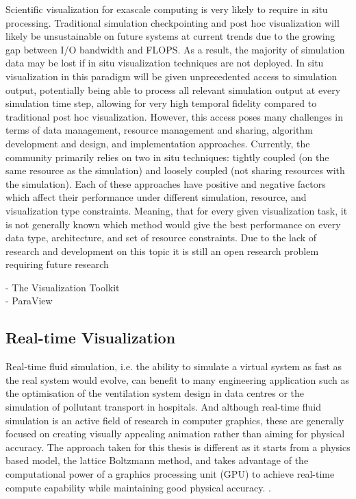 Scientific visualization for exascale computing is very likely to require in situ processing. Traditional simulation checkpointing and post hoc visualization will likely be unsustainable on future systems at current trends due to the growing gap between I/O bandwidth and FLOPS. As a result, the majority of simulation data may be lost if in situ visualization techniques are not deployed. In situ visualization in this paradigm will be given unprecedented access to simulation output, potentially being able to process all relevant simulation output at every simulation time step, allowing for very high temporal fidelity compared to traditional post hoc visualization. However, this access poses many challenges in terms of data management, resource management and sharing, algorithm development and design, and implementation approaches. Currently, the community primarily relies on two in situ techniques: tightly coupled (on the same resource as the simulation) and loosely coupled (not sharing resources with the simulation). Each of these approaches have positive and negative factors which affect their performance under different simulation, resource, and visualization type constraints. Meaning, that for every given visualization task, it is not generally known which method would give the best performance on every data type, architecture, and set of resource constraints. Due to the lack of research and development on this topic it is still an open research problem requiring future research
\citep{kressSituVisualizationTechniques}

- The Visualization Toolkit \\
- ParaView \\


\subsection{Real-time Visualization}
\label{rt-viz}

Real-time fluid simulation, i.e. the ability to simulate a virtual system as fast as the real system would evolve, can benefit to many engineering application such as the optimisation of the ventilation system design in data centres or the simulation of pollutant transport in hospitals. And although real-time fluid simulation is an active field of research in computer graphics, these are generally focused on creating visually appealing animation rather than aiming for physical accuracy. The approach taken for this thesis is different as it starts from a physics based model, the lattice Boltzmann method, and takes advantage of the computational power of a graphics processing unit (GPU) to achieve real-time compute capability while maintaining good physical accuracy. \cite{delboscRealTimeSimulationIndoor}.

